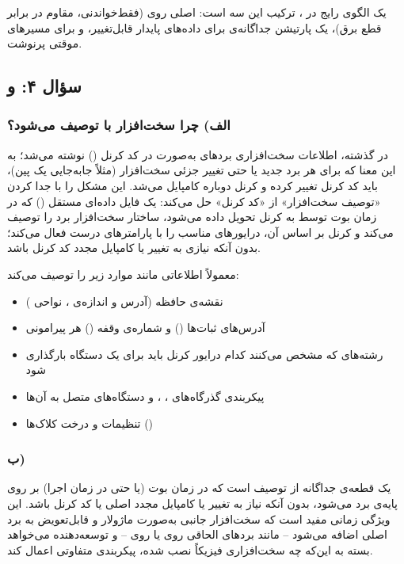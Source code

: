 یک الگوی رایج در ، ترکیب این سه است:  اصلی روی  (فقط‌خواندنی، مقاوم در برابر قطع برق)، یک پارتیشن جداگانه‌ی  برای داده‌های پایدار قابل‌تغییر، و  برای مسیرهای موقتی پرنوشت.

\subsection{سؤال ۴:  و }

\subsubsection*{الف) چرا سخت‌افزار با  توصیف می‌شود؟}

در گذشته، اطلاعات سخت‌افزاری بردهای  به‌صورت  در کد کرنل () نوشته می‌شد؛ به این معنا که برای هر برد جدید یا حتی تغییر جزئی سخت‌افزار (مثلاً جابه‌جایی یک پین)، باید کد کرنل تغییر کرده و کرنل دوباره کامپایل می‌شد.  این مشکل را با جدا کردن «توصیف سخت‌افزار» از «کد کرنل» حل می‌کند: یک فایل داده‌ای مستقل () که در زمان بوت توسط  به کرنل تحویل داده می‌شود، ساختار سخت‌افزار برد را توصیف می‌کند و کرنل بر اساس آن، درایورهای مناسب را با پارامترهای درست فعال می‌کند؛ بدون آنکه نیازی به تغییر یا کامپایل مجدد کد کرنل باشد.

 معمولاً اطلاعاتی مانند موارد زیر را توصیف می‌کند:
\begin{itemize}
	\item نقشه‌ی حافظه (آدرس و اندازه‌ی ، نواحی )
	\item آدرس‌های ثبات‌ها () و شماره‌ی وقفه‌ () هر پیرامونی
	\item رشته‌های  که مشخص می‌کنند کدام درایور کرنل باید برای یک دستگاه بارگذاری شود
	\item پیکربندی گذرگاه‌های ،‏ ،‏  و دستگاه‌های متصل به آن‌ها
	\item تنظیمات  و درخت کلاک‌ها ()
\end{itemize}

\subsubsection*{ب) }

 یک قطعه‌ی جداگانه از توصیف  است که در زمان بوت (یا حتی در زمان اجرا) بر روی  پایه‌ی برد  می‌شود، بدون آنکه نیاز به تغییر یا کامپایل مجدد  اصلی یا کد کرنل باشد. این ویژگی زمانی مفید است که سخت‌افزار جانبی به‌صورت ماژولار و قابل‌تعویض به برد اصلی اضافه می‌شود -- مانند بردهای الحاقی  روی  یا  روی  -- و توسعه‌دهنده می‌خواهد بسته به این‌که چه سخت‌افزاری فیزیکاً نصب شده، پیکربندی متفاوتی اعمال کند.

